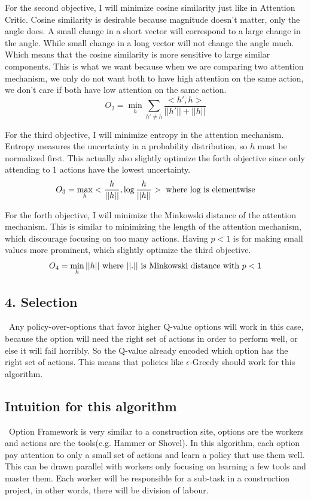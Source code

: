 \documentclass{article}
\begin{document}
	\quad For the second objective, I will minimize cosine similarity just like in Attention Critic. Cosine similarity is desirable because magnitude doesn't matter, only the angle does. A small change in a short vector will correspond to a large change in the angle. While small change in a long vector will not change the angle much. Which means that the cosine similarity is more sensitive to large similar components. This is what we want because when we are comparing two attention mechanism, we only do not want both to have high attention on the same action, we don't care if both have low attention on the same action.$$O_2 = \min_h \sum_{h' \neq h} \frac{<h', h>}{||h'||+||h||}$$
	
	\quad For the third objective, I will minimize entropy in the attention mechanism. Entropy measures the uncertainty in a probability distribution, so $h$ must be normalized first. This actually also slightly optimize the forth objective since only attending to 1 actions have the lowest uncertainty.$$O_3 = \max_h <\frac{h}{||h||},\log \frac{h}{||h||}> \textnormal{ where log is elementwise}$$
	
	\quad For the forth objective, I will minimize the Minkowski distance of the attention mechanism. This is similar to minimizing the length of the attention mechanism, which discourage focusing on too many actions. Having $p<1$ is for making small values more prominent, which slightly optimize the third objective.$$O_4 = \min_h ||h|| \textnormal{ where }||.||\textnormal{ is Minkowski distance with } p<1$$
	
	\subsection*{4. Selection}
	\qquad \ Any policy-over-options that favor higher Q-value options will work in this case, because the option will need the right set of actions in order to perform well, or else it will fail horribly. So the Q-value already encoded which option has the right set of actions. This means that policies like $\epsilon$-Greedy should work for this algorithm.
	
	\subsection*{Intuition for this algorithm}
	\qquad \ Option Framework is very similar to a construction site, options are the workers and actions are the tools(e.g. Hammer or Shovel). In this algorithm, each option pay attention to only a small set of actions and learn a policy that use them well. This can be drawn parallel with workers only focusing on learning a few tools and master them. Each worker will be responsible for a sub-task in a construction project, in other words, there will be division of labour. 
	
\end{document}
